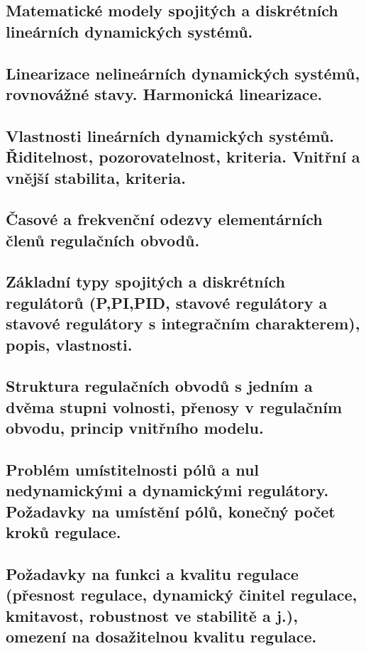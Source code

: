 \subsection{Matematické modely spojitých a diskrétních lineárních dynamických systémů.}

\subsection{Linearizace nelineárních dynamických systémů, rovnovážné stavy. Harmonická linearizace.}

\subsection{Vlastnosti lineárních dynamických systémů. Řiditelnost, pozorovatelnost, kriteria. Vnitřní a vnější stabilita, kriteria.}

\subsection{Časové a frekvenční odezvy elementárních členů regulačních obvodů.}

\subsection{Základní typy spojitých a diskrétních regulátorů (P,PI,PID, stavové regulátory a stavové regulátory s integračním charakterem), popis, vlastnosti.}

\subsection{Struktura regulačních obvodů s jedním a dvěma stupni volnosti, přenosy v regulačním obvodu, princip vnitřního modelu.}

\subsection{Problém umístitelnosti pólů a nul nedynamickými a dynamickými regulátory. Požadavky na umístění pólů, konečný počet kroků regulace.}

\subsection{Požadavky na funkci a kvalitu regulace (přesnost regulace, dynamický činitel regulace, kmitavost, robustnost ve stabilitě a j.), omezení na dosažitelnou kvalitu regulace.}

